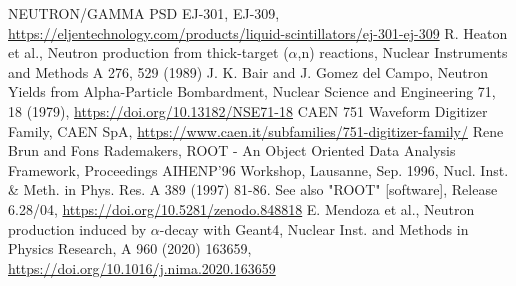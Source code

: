 \documentclass[a4paper,12pt]{report}
\newcommand{\an}{($\alpha$,n) }
\begin{document}
\begin{thebibliography}{5}
	NEUTRON/GAMMA PSD EJ-301, EJ-309, \url{https://eljentechnology.com/products/liquid-scintillators/ej-301-ej-309}
	R. Heaton et al., Neutron production from thick-target \an reactions, Nuclear Instruments and Methods A 276, 529 (1989)
	J. K. Bair and J. Gomez del Campo, Neutron Yields from Alpha-Particle Bombardment, Nuclear Science and Engineering 71, 18 (1979), \url{https://doi.org/10.13182/NSE71-18}
	CAEN 751 Waveform Digitizer Family, CAEN SpA, \url{https://www.caen.it/subfamilies/751-digitizer-family/}
	Rene Brun and Fons Rademakers, ROOT - An Object Oriented Data Analysis Framework, Proceedings AIHENP'96 Workshop, Lausanne, Sep. 1996, Nucl. Inst. \& Meth. in Phys. Res. A 389 (1997) 81-86. See also "ROOT" [software], Release 6.28/04, \url{https://doi.org/10.5281/zenodo.848818}
	E. Mendoza et al., Neutron production induced by $\alpha$-decay with Geant4, Nuclear Inst. and Methods in Physics Research, A 960 (2020) 163659, \url{https://doi.org/10.1016/j.nima.2020.163659}
\end{thebibliography}
\end{document}
